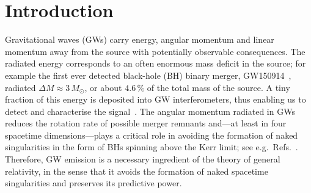 



\def\aj{\rm{AJ}}
\def\apj{\rm{ApJ}}
\def\apjl{\rm{ApJ}}
\def\apjs{\rm{ApJS}}
\def\aap{\rm{A\&A}}
\def\aaps{\rm{A\&AS}}
\def\mnras{\rm{MNRAS}}
\def\prd{\rm{PRD}}
\def\prl{\rm{PRL}}
\def\prx{\rm{PRX}}
\def\nat{\rm{Nature}}
\def\cqg{\rm{CQG}}
\def\grg{\rm{GRG}}
\def\lrr{\rm{LRR}}
\newcommand{\rad}{\mathrm{rad}}
\newcommand{\tl}{\tilde{\ell}}
\newcommand{\tm}{\tilde{m}}
\newcommand{\rmd}{\mathrm{d}}




\section{Introduction}

Gravitational waves (GWs) carry energy, angular momentum and linear
momentum away from the source with potentially observable
consequences. The radiated energy corresponds to an often enormous
mass deficit in the source; for example the first ever detected
black-hole (BH) binary merger, GW150914~\cite{Abbott:2016blz}, radiated
$\Delta M\approx 3\,M_{\odot}$, or about $4.6\,\%$ of the total mass
of the source. A tiny fraction of this energy is deposited into GW
interferometers, thus enabling us to detect and characterise the
signal~\cite{Saulson:2010zz}. The angular momentum radiated in GWs
reduces the rotation rate of possible merger remnants and---at least
in four spacetime dimensions---plays a critical role in avoiding the
formation of naked singularities in the form of BHs spinning above the
Kerr limit; see
e.g.~Refs.~\cite{Campanelli:2006uy,Sperhake:2009jz}. Therefore, GW emission
is a necessary ingredient of the theory of general relativity, in the
sense that it avoids the formation of naked spacetime singularities and
preserves its predictive power.

